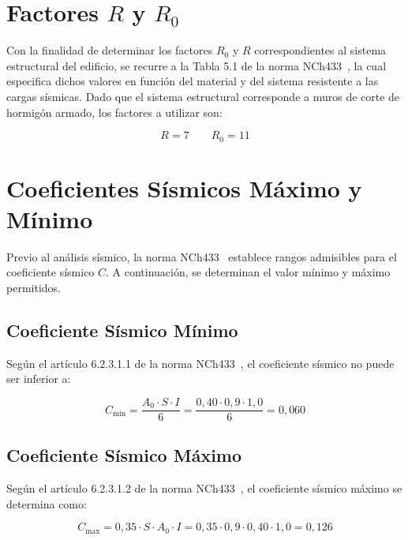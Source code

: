 \section{Factores $R$ y $R_0$}
\label{sec:factores R}
Con la finalidad de determinar los factores $R_0$ y $R$ correspondientes al sistema estructural 
del edificio, se recurre a la Tabla 5.1 de la norma NCh433~\cite{NCh433:1996}, la 
cual especifica dichos valores en función del material y del sistema resistente a 
las cargas sísmicas. Dado que el sistema estructural corresponde a muros de corte 
de hormigón armado, los factores a utilizar son:

\begin{equation}
    R = 7 \qquad R_0 = 11
\end{equation}

\section{Coeficientes Sísmicos Máximo y Mínimo}

Previo al análisis sísmico, la norma NCh433~\cite{NCh433:1996} establece rangos 
admisibles para el coeficiente sísmico $C$. A continuación, se determinan el valor 
mínimo y máximo permitidos.

\subsection{Coeficiente Sísmico Mínimo}

Según el artículo 6.2.3.1.1 de la norma NCh433~\cite{NCh433:1996}, el coeficiente 
sísmico no puede ser inferior a:

\begin{equation}
    C_{\min} = \frac{A_0 \cdot S \cdot I}{6} = \frac{0{,}40 \cdot 0{,}9 \cdot 1{,}0}{6} 
    = 0{,}060
\end{equation}

\subsection{Coeficiente Sísmico Máximo}

Según el artículo 6.2.3.1.2 de la norma NCh433~\cite{NCh433:1996}, el coeficiente 
sísmico máximo se determina como:

\begin{equation}
    C_{\max} = 0{,}35 \cdot S \cdot A_0 \cdot I 
    = 0{,}35 \cdot 0{,}9 \cdot 0{,}40 \cdot 1{,}0 = 0{,}126
\end{equation}

